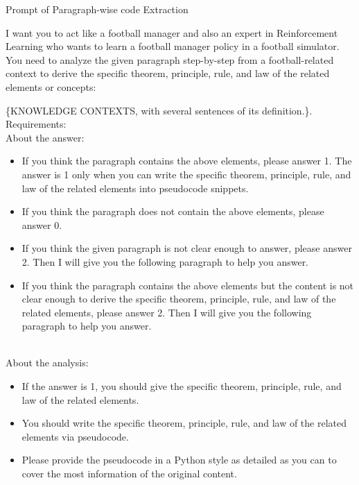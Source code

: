 \begin{gbox}{Prompt of Paragraph-wise code Extraction}

I want you to act like a football manager and also an expert in Reinforcement Learning who wants to learn a football manager policy in a football simulator.
~\\

You need to analyze the given paragraph step-by-step from a football-related context to derive the specific theorem, principle, rule, and law of the related elements or concepts:

\hspace{10mm} \{KNOWLEDGE CONTEXTS, with several sentences of its definition.\}.
~\\

Requirements:
~\\

About the answer:

\begin{itemize}
    \item If you think the paragraph contains the above elements, please answer 1. The answer is 1 only when you can write the specific theorem, principle, rule, and law of the related elements into pseudocode snippets.
    \item If you think the paragraph does not contain the above elements, please answer 0.
    \item If you think the given paragraph is not clear enough to answer, please answer 2. Then I will give you the following paragraph to help you answer.
    \item If you think the paragraph contains the above elements but the content is not clear enough to derive the specific theorem, principle, rule, and law of the related elements, please answer 2. Then I will give you the following paragraph to help you answer.
\end{itemize}
~\\

About the analysis:
\begin{itemize}
    \item  If the answer is 1, you should give the specific theorem, principle, rule, and law of the related elements.
    \item You should write the specific theorem, principle, rule, and law of the related elements via pseudocode.
    \item Please provide the pseudocode in a Python style as detailed as you can to cover the most information of the original content.
\end{itemize}
~\\


\end{gbox}
